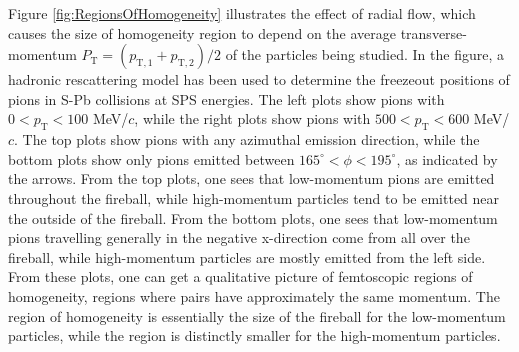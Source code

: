 Figure \ref{fig:RegionsOfHomogeneity} illustrates the effect of radial flow, which causes the size of homogeneity region to depend on the average transverse-momentum $P_\mathrm{T} = (p_\mathrm{T,1} + p_\mathrm{T,2})/2$ of the particles being studied.
In the figure, a hadronic rescattering model \cite{Humanic:2005ye} has been used to determine the freezeout positions of pions in S-Pb collisions at SPS energies.
The left plots show pions with $0 < p_\mathrm{T} < 100$ MeV/$c$, while the right plots show pions with $500 < p_\mathrm{T} < 600$ MeV/$c$.
The top plots show pions with any azimuthal emission direction, while the bottom plots show only pions emitted between $165^\circ < \phi < 195^\circ$, as indicated by the arrows.
From the top plots, one sees that low-momentum pions are emitted throughout the fireball, while high-momentum particles tend to be emitted near the outside of the fireball.
From the bottom plots, one sees that low-momentum pions travelling generally in the negative x-direction come from all over the fireball, while high-momentum particles are mostly emitted from the left side.
From these plots, one can get a qualitative picture of femtoscopic regions of homogeneity, regions where pairs have approximately the same momentum.
The region of homogeneity is essentially the size of the fireball for the low-momentum particles, while the region is distinctly smaller for the high-momentum particles.

